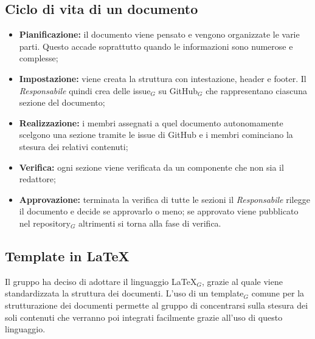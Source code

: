 \subsection{Ciclo di vita di un documento}
\begin{itemize}
    \item \textbf{Pianificazione:} il documento viene pensato e vengono organizzate le varie parti. Questo accade soprattutto quando le informazioni sono numerose e complesse;
    \item \textbf{Impostazione:} viene creata la struttura con intestazione, header e footer. Il \textit{Responsabile} quindi crea delle issue$_G$ su GitHub$_G$ che rappresentano ciascuna sezione del documento;
    \item \textbf{Realizzazione:} i membri assegnati a quel documento autonomamente scelgono una sezione tramite le issue di GitHub e i membri cominciano la stesura dei relativi contenuti;
    \item \textbf{Verifica:} ogni sezione viene verificata da un componente che non sia il redattore;
    \item \textbf{Approvazione:} terminata la verifica di tutte le sezioni il \textit{Responsabile} rilegge il documento e decide se approvarlo o meno; se approvato viene pubblicato nel repository$_G$ altrimenti si torna alla fase di verifica.
\end{itemize}
\subsection{Template in \LaTeX{}}
Il gruppo ha deciso di adottare il linguaggio \LaTeX{}$_G$, grazie al quale viene standardizzata
la struttura dei documenti. L’uso di un template$_G$ comune per la strutturazione dei documenti permette al gruppo di concentrarsi sulla stesura dei soli contenuti che verranno poi integrati facilmente grazie all'uso di questo linguaggio.
